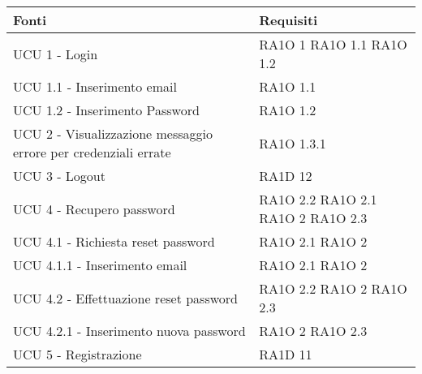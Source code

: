       \begin{center}
      \bgroup
      \def\arraystretch{1.8}
      \begin{longtable}{ | p{5cm} | p{5cm} |}
    
      \cellcolor[gray]{0.9} \textbf{Fonti} & \cellcolor[gray]{0.9} \textbf{Requisiti} \\ \hline       
            UCU 1 - Login &  RA1O 1 \newline  RA1O 1.1 \newline  RA1O 1.2 \newline  \\ \hline      
            UCU 1.1 - Inserimento email &  RA1O 1.1 \newline  \\ \hline      
            UCU 1.2 - Inserimento Password &  RA1O 1.2 \newline  \\ \hline      
            UCU 2 - Visualizzazione messaggio errore per credenziali errate &  RA1O 1.3.1 \newline  \\ \hline      
            UCU 3 - Logout &  RA1D 12 \newline  \\ \hline      
            UCU 4 - Recupero password &  RA1O 2.2 \newline  RA1O 2.1 \newline  RA1O 2 \newline  RA1O 2.3 \newline  \\ \hline      
            UCU 4.1 - Richiesta reset password &  RA1O 2.1 \newline  RA1O 2 \newline  \\ \hline      
            UCU 4.1.1 - Inserimento email &  RA1O 2.1 \newline  RA1O 2 \newline  \\ \hline      
            UCU 4.2 - Effettuazione reset password &  RA1O 2.2 \newline  RA1O 2 \newline  RA1O 2.3 \newline  \\ \hline      
            UCU 4.2.1 - Inserimento nuova password &  RA1O 2 \newline  RA1O 2.3 \newline  \\ \hline      
            UCU 5 - Registrazione &  RA1D 11 \newline  \\ \hline      

\end{longtable}
\end{center}
